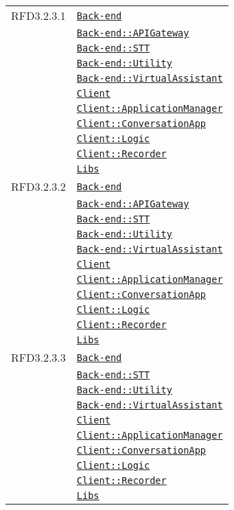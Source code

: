 \begin{longtable}{|>{\centering}m{3cm}|m{10cm}<{\centering}|}
RFD3.2.3.1 & \hyperref[Back-end]{\texttt{Back-end}}\\
& \hyperref[Back-end::APIGateway]{\texttt{Back-end::APIGateway}}\\
& \hyperref[Back-end::STT]{\texttt{Back-end::STT}}\\
& \hyperref[Back-end::Utility]{\texttt{Back-end::Utility}}\\
& \hyperref[Back-end::VirtualAssistant]{\texttt{Back-end::VirtualAssistant}}\\
& \hyperref[Client]{\texttt{Client}}\\
& \hyperref[Client::ApplicationManager]{\texttt{Client::ApplicationManager}}\\
& \hyperref[Client::ConversationApp]{\texttt{Client::ConversationApp}}\\
& \hyperref[Client::Logic]{\texttt{Client::Logic}}\\
& \hyperref[Client::Recorder]{\texttt{Client::Recorder}}\\
& \hyperref[Libs]{\texttt{Libs}}\\ \hline

RFD3.2.3.2 & \hyperref[Back-end]{\texttt{Back-end}}\\
& \hyperref[Back-end::APIGateway]{\texttt{Back-end::APIGateway}}\\
& \hyperref[Back-end::STT]{\texttt{Back-end::STT}}\\
& \hyperref[Back-end::Utility]{\texttt{Back-end::Utility}}\\
& \hyperref[Back-end::VirtualAssistant]{\texttt{Back-end::VirtualAssistant}}\\
& \hyperref[Client]{\texttt{Client}}\\
& \hyperref[Client::ApplicationManager]{\texttt{Client::ApplicationManager}}\\
& \hyperref[Client::ConversationApp]{\texttt{Client::ConversationApp}}\\
& \hyperref[Client::Logic]{\texttt{Client::Logic}}\\
& \hyperref[Client::Recorder]{\texttt{Client::Recorder}}\\
& \hyperref[Libs]{\texttt{Libs}}\\ \hline

RFD3.2.3.3 & \hyperref[Back-end]{\texttt{Back-end}}\\
& \hyperref[Back-end::STT]{\texttt{Back-end::STT}}\\
& \hyperref[Back-end::Utility]{\texttt{Back-end::Utility}}\\
& \hyperref[Back-end::VirtualAssistant]{\texttt{Back-end::VirtualAssistant}}\\
& \hyperref[Client]{\texttt{Client}}\\
& \hyperref[Client::ApplicationManager]{\texttt{Client::ApplicationManager}}\\
& \hyperref[Client::ConversationApp]{\texttt{Client::ConversationApp}}\\
& \hyperref[Client::Logic]{\texttt{Client::Logic}}\\
& \hyperref[Client::Recorder]{\texttt{Client::Recorder}}\\
& \hyperref[Libs]{\texttt{Libs}}\\ \hline


\end{longtable}
